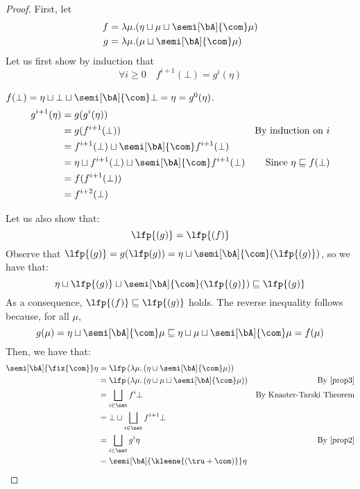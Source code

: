 \begin{proof}
  First, let
  \begin{align*}
    f & = \lambda \mu . (\eta \sqcup \mu \sqcup \semi[\bA]{\com}\mu)\\
    g & = \lambda \mu .(\mu \sqcup \semi[\bA]{\com}\mu)
  \end{align*}
  Let us first show by induction that 
  \begin{equation}\label{prop2}
    \forall i\geq 0 \quad f^{i+1} (\bot) = g^{i} (\eta) 
  \end{equation}

  \noindent
  \begin{inductive}
     \(f(\bot) = \eta \sqcup \bot \sqcup \semi[\bA]{\com}\bot = \eta = g^0 (\eta)\).
    \begin{align*}
      g^{i+1}(\eta) & = g (g^i (\eta)) \\
                    & = g(f^{i+1}(\bot)) & \text{By induction on } i \\
                    & = f^{i+1}(\bot) \sqcup \semi[\bA]{\com}f^{i+1}(\bot) \\
                    & = \eta \sqcup f^{i+1}(\bot) \sqcup \semi[\bA]{\com}f^{i+1}(\bot) & \text{Since } \eta \sqsubseteq f(\bot)\\
                    & = f ( f^{i+1}(\bot)) \\
                    & = f^{i+2}(\bot)
    \end{align*}
  \end{inductive}
  
  Let us also show that:
  \begin{equation}\label{prop3}
    \lfp{(g)} = \lfp{(f)}
  \end{equation}
  Observe that
  \(\lfp{(g)} = g(\lfp(g)) = \eta \sqcup
  \semi[\bA]{\com}(\lfp{(g)})\), so we have that:
  \[
    \eta \sqcup \lfp{(g)} \sqcup \semi[\bA]{\com}(\lfp{(g)})
    \sqsubseteq \lfp{(g)}
  \]
  As a consequence, \(\lfp{(f)}\sqsubseteq \lfp{(g)}\) holds. The
  reverse inequality follows because, for all \(\mu\),
  \begin{equation*}
    g(\mu) = \eta \sqcup \semi[\bA]{\com} \mu \sqsubseteq \eta \sqcup \mu \sqcup \semi[\bA]{\com} \mu = f(\mu)
  \end{equation*}
  Then, we have that:
  \begin{align*}
    \semi[\bA]{\fix{\com}} \eta & = \lfp\left({\lambda \mu. \left(\eta \sqcup \semi[\bA]{\com} \mu\right)}\right) \\
    & = \lfp\left({\lambda \mu. \left(\eta \sqcup \mu \sqcup \semi[\bA]{\com} \mu\right)}\right) &  \text{By~\eqref{prop3}}\\
    & = \bigsqcup_{i \in \nat} {f}^i \bot & \text{By Knaster-Tarski Theorem} \\
    & = \bot \sqcup \bigsqcup_{i \in \nat} {f}^{i+1} \bot \\
    & = \bigsqcup_{i \in \nat} {g}^{i} \eta & \text{By~\eqref{prop2}}\\
    & = \semi[\bA]{\kleene{\left(\tru + \com\right)}} \eta
  \end{align*}  
\end{proof}
